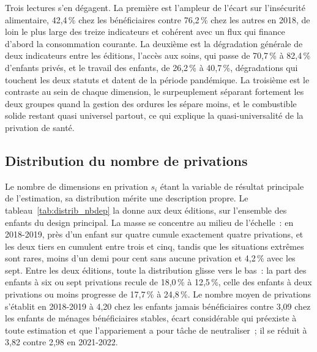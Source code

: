 Trois lectures s'en dégagent. La première est l'ampleur de l'écart sur
l'insécurité alimentaire, 42,4\,\% chez les bénéficiaires contre 76,2\,\%
chez les autres en 2018, de loin le plus large des treize indicateurs et
cohérent avec un flux qui finance d'abord la consommation courante. La
deuxième est la dégradation générale de deux indicateurs entre les
éditions, l'accès aux soins, qui passe de 70,7\,\% à 82,4\,\% d'enfants
privés, et le travail des enfants, de 26,2\,\% à 40,7\,\%, dégradations
qui touchent les deux statuts et datent de la période pandémique. La
troisième est le contraste au sein de chaque dimension, le surpeuplement
séparant fortement les deux groupes quand la gestion des ordures les
sépare moins, et le combustible solide restant quasi universel partout, ce
qui explique la quasi-universalité de la privation de santé.

\subsection{Distribution du nombre de privations}
\label{subsec:nbdep}

Le nombre de dimensions en privation $s_i$ étant la variable de résultat
principale de l'estimation, sa distribution mérite une description propre.
Le tableau~\ref{tab:distrib_nbdep} la donne aux deux éditions, sur
l'ensemble des enfants du design principal. La masse se concentre au
milieu de l'échelle~: en 2018-2019, près d'un enfant sur quatre cumule
exactement quatre privations, et les deux tiers en cumulent entre trois et
cinq, tandis que les situations extrêmes sont rares, moins d'un demi pour
cent sans aucune privation et 4,2\,\% avec les sept. Entre les deux
éditions, toute la distribution glisse vers le bas~: la part des enfants à
six ou sept privations recule de 18,0\,\% à 12,5\,\%, celle des enfants à
deux privations ou moins progresse de 17,7\,\% à 24,8\,\%. Le nombre moyen
de privations s'établit en 2018-2019 à 4,20 chez les enfants jamais
bénéficiaires contre 3,09 chez les enfants de ménages bénéficiaires
stables, écart considérable qui préexiste à toute estimation et que
l'appariement a pour tâche de neutraliser~; il se réduit à 3,82 contre
2,98 en 2021-2022.

